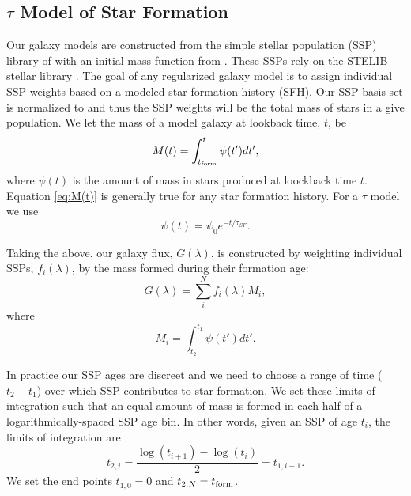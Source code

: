 \begin{appendices}
\section{$\tau$ Model of Star Formation}
\label{sec:tau_model}
Our galaxy models are constructed from the simple stellar population
(SSP) library of \citet{Bruzual03} with an initial mass function from
\citet{Chabrier03}. These SSPs rely on the STELIB stellar library
\citep{LeBorgne03}. The goal of any regularized galaxy model is to
assign individual SSP weights based on a modeled star formation
history (SFH). Our SSP basis set is normalized to 
and thus the SSP weights will be the total mass of stars in a give
population. We let the mass of a model galaxy at lookback time, $t$,
be
\begin{equation}
\label{eq:M(t)}
M(t) = \int_{t_{\rm form}}^t \psi(t') dt',
\end{equation}
where $\psi(t)$ is the amount of mass in stars produced at loockback time
$t$. Equation \ref{eq:M(t)} is generally true for any star formation
history. For a $\tau$ model we use
\begin{equation}
\label{eq:taumodel}
\psi(t) = \psi_0 e^{-t/\tau_{SF}}.
\end{equation}

Taking the above, our galaxy flux, $G(\lambda)$, is constructed by weighting
individual SSPs, $f_i(\lambda)$, by the mass formed during their formation age:
\begin{equation}
G(\lambda) = \sum_i^N f_i(\lambda) M_i,
\end{equation}
where
\begin{equation}
M_i = \int_{t_2}^{t_1} \psi(t') dt'.
\end{equation}

In practice our SSP ages are discreet and we need to choose a range of time
($t_2 - t_1$) over which SSP contributes to star formation. We set these
limits of integration such that an equal amount of mass is formed in each half
of a logarithmically-spaced SSP age bin. In other words, given an SSP of age
$t_i$, the limits of integration are
\begin{equation}
t_{2,i} = \frac{\log (t_{i+1}) - \log (t_i)}{2} = t_{1,i+1}.
\end{equation}
We set the end points $t_{1,0} = 0$ and $t_{2,N} = t_{\rm form}$.


\end{appendices}
